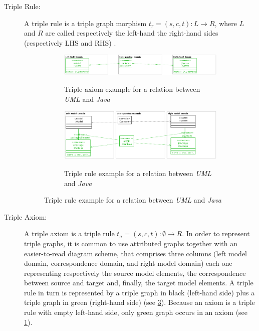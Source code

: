 \documentclass[tuberlin,cic,tc,english,noabntcite]{iiufrgs}
\begin{document}
\begin{description}
	\item[Triple Rule:] A triple rule is a triple graph morphism $t_r = (s, c, t) : L \rightarrow R$, where $L$ and $R$ are called respectively the left-hand the right-hand sides (respectively LHS and RHS) \citep{ehrig2007information}.
	
	\begin{figure}[H]
		    \caption{An example of two triple rules}
		    \label{fig:tgg_axiom_rule}
		    \centering
		    \begin{subfigure}{.7\textwidth}
			    \caption{Triple axiom example for a relation between \emph{UML} and \emph{Java}}
		        \includegraphics[width=\textwidth]{tgg_axiom} 
		        \label{fig:tgg_axiom}  
		    \end{subfigure}
		    \begin{subfigure}{.7\textwidth}
			    \caption{Triple rule example for a relation between \emph{UML} and \emph{Java}}
		        \includegraphics[width=\textwidth]{tgg_rule} 
		        \label{fig:tgg_rule}  
		    \end{subfigure}
		\end{figure}
		
	\item[Triple Axiom:] A triple axiom is a triple rule $t_a = (s, c, t) : \emptyset \rightarrow R$. In order to represent triple graphs, it is common to use attributed graphs together with an easier-to-read diagram scheme, that comprises three columns (left model domain, correspondence domain, and right model domain) each one representing respectively the source model elements, the correspondence between source and target and, finally, the target model elements. A triple rule in turn is represented by a triple graph in black (left-hand side) plus a triple graph in green (right-hand side) (see \ref{fig:tgg_rule}). Because an axiom is a triple rule with empty left-hand side, only green graph occurs in an axiom (see \ref{fig:tgg_axiom}).


\end{description}
\end{document}
